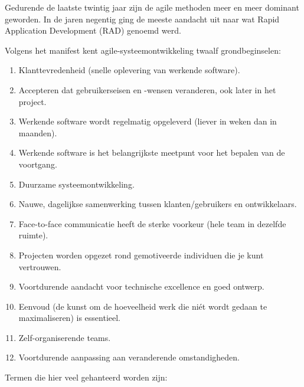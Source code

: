 Gedurende de laatste twintig jaar zijn de agile methoden meer en meer dominant geworden. In de jaren negentig ging de meeste aandacht uit naar wat Rapid Application Development (RAD) genoemd werd.

Volgens het manifest kent agile-systeemontwikkeling twaalf grondbeginselen:

\begin{enumerate}
    \item Klanttevredenheid (snelle oplevering van werkende software).
    \item Accepteren dat gebruikerseisen en -wensen veranderen, ook later in het project.
    \item Werkende software wordt regelmatig opgeleverd (liever in weken dan in maanden).
    \item Werkende software is het belangrijkste meetpunt voor het bepalen van de voortgang.
    \item Duurzame systeemontwikkeling.
    \item Nauwe, dagelijkse samenwerking tussen klanten/gebruikers en ontwikkelaars.
    \item Face-to-face communicatie heeft de sterke voorkeur (hele team in dezelfde ruimte).
    \item Projecten worden opgezet rond gemotiveerde individuen die je kunt vertrouwen.
    \item Voortdurende aandacht voor technische excellence en goed ontwerp.
    \item Eenvoud (de kunst om de hoeveelheid werk die niét wordt gedaan te maximaliseren) is essentieel.
    \item Zelf-organiserende teams.
    \item Voortdurende aanpassing aan veranderende omstandigheden.
\end{enumerate}

Termen die hier veel gehanteerd worden zijn:

